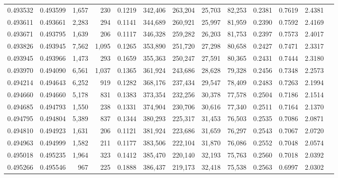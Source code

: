 \begin{tabular}{rrrrrrrrrrrrr}
0.493532 & 0.493599 &  1,657 &   230 &                                     0.1219 & 342,406 & 263,204 &  25,703 &  82,253 & 0.2381 & 0.7619 & 2.4381 \\
0.493611 & 0.493661 &  2,283 &   294 &                                     0.1141 & 344,689 & 260,921 &  25,997 &  81,959 & 0.2390 & 0.7592 & 2.4169 \\
0.493671 & 0.493795 &  1,639 &   206 &                                     0.1117 & 346,328 & 259,282 &  26,203 &  81,753 & 0.2397 & 0.7573 & 2.4017 \\
0.493826 & 0.493945 &  7,562 & 1,095 &                                     0.1265 & 353,890 & 251,720 &  27,298 &  80,658 & 0.2427 & 0.7471 & 2.3317 \\
0.493945 & 0.493966 &  1,473 &   293 &                                     0.1659 & 355,363 & 250,247 &  27,591 &  80,365 & 0.2431 & 0.7444 & 2.3180 \\
0.493970 & 0.494090 &  6,561 & 1,037 &                                     0.1365 & 361,924 & 243,686 &  28,628 &  79,328 & 0.2456 & 0.7348 & 2.2573 \\
0.494214 & 0.494643 &  6,252 &   919 &                                     0.1282 & 368,176 & 237,434 &  29,547 &  78,409 & 0.2483 & 0.7263 & 2.1994 \\
0.494660 & 0.494660 &  5,178 &   831 &                                     0.1383 & 373,354 & 232,256 &  30,378 &  77,578 & 0.2504 & 0.7186 & 2.1514 \\
0.494685 & 0.494793 &  1,550 &   238 &                                     0.1331 & 374,904 & 230,706 &  30,616 &  77,340 & 0.2511 & 0.7164 & 2.1370 \\
0.494795 & 0.494804 &  5,389 &   837 &                                     0.1344 & 380,293 & 225,317 &  31,453 &  76,503 & 0.2535 & 0.7086 & 2.0871 \\
0.494810 & 0.494923 &  1,631 &   206 &                                     0.1121 & 381,924 & 223,686 &  31,659 &  76,297 & 0.2543 & 0.7067 & 2.0720 \\
0.494963 & 0.494999 &  1,582 &   211 &                                     0.1177 & 383,506 & 222,104 &  31,870 &  76,086 & 0.2552 & 0.7048 & 2.0574 \\
0.495018 & 0.495235 &  1,964 &   323 &                                     0.1412 & 385,470 & 220,140 &  32,193 &  75,763 & 0.2560 & 0.7018 & 2.0392 \\
0.495266 & 0.495546 &    967 &   225 &                                     0.1888 & 386,437 & 219,173 &  32,418 &  75,538 & 0.2563 & 0.6997 & 2.0302 \\

\end{tabular}
